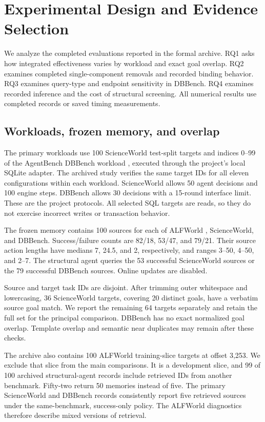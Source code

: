 \section{Experimental Design and Evidence Selection}
\label{sec:setup}

We analyze the completed evaluations reported in the formal archive. RQ1 asks how integrated effectiveness varies by workload and exact goal overlap. RQ2 examines completed single-component removals and recorded binding behavior. RQ3 examines query-type and endpoint sensitivity in DBBench. RQ4 examines recorded inference and the cost of structural screening. All numerical results use completed records or saved timing measurements.

\subsection{Workloads, frozen memory, and overlap}
The primary workloads use 100 ScienceWorld \cite{wang2022scienceworld} test-split targets and indices 0--99 of the AgentBench DBBench workload \cite{liu2024agentbench}, executed through the project's local SQLite adapter. The archived study verifies the same target IDs for all eleven configurations within each workload. ScienceWorld allows 50 agent decisions and 100 engine steps. DBBench allows 30 decisions with a 15-round interface limit. These are the project protocols. All selected SQL targets are reads, so they do not exercise incorrect writes or transaction behavior.

The frozen memory contains 100 sources for each of ALFWorld \cite{shridhar2021alfworld}, ScienceWorld, and DBBench. Success/failure counts are 82/18, 53/47, and 79/21. Their source action lengths have medians 7, 24.5, and 2, respectively, and ranges 3--50, 4--50, and 2--7. The structural agent queries the 53 successful ScienceWorld sources or the 79 successful DBBench sources. Online updates are disabled.

Source and target task IDs are disjoint. After trimming outer whitespace and lowercasing, 36 ScienceWorld targets, covering 20 distinct goals, have a verbatim source goal match. We report the remaining 64 targets separately and retain the full set for the principal comparison. DBBench has no exact normalized goal overlap. Template overlap and semantic near duplicates may remain after these checks.

The archive also contains 100 ALFWorld training-slice targets at offset 3,253. We exclude that slice from the main comparisons. It is a development slice, and 99 of 100 archived structural-agent records include retrieved IDs from another benchmark. Fifty-two return 50 memories instead of five. The primary ScienceWorld and DBBench records consistently report five retrieved sources under the same-benchmark, success-only policy. The ALFWorld diagnostics therefore describe mixed versions of retrieval.

